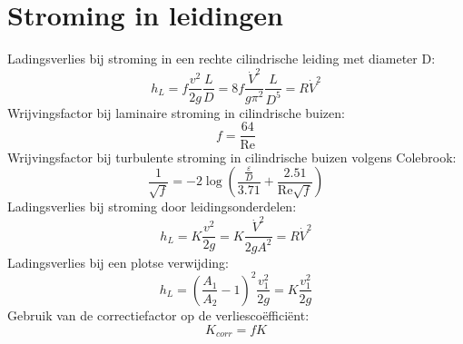 	\section{Stroming in leidingen}
\begin{multicols}{2}
	Ladingsverlies bij stroming in een rechte cilindrische leiding met diameter D:
	\begin{equation}
		h_L = f \frac{v^2}{2 g}\frac{L}{D} = 8 f \frac{\dot{V}^2}{g \pi^2}\frac{L}{D^5} = R \dot{V}^2
	\end{equation}
	Wrijvingsfactor bij laminaire stroming in cilindrische buizen:
	\begin{equation}
		f = \frac{64}{\text{Re}}
	\end{equation}
	Wrijvingsfactor bij turbulente stroming in cilindrische buizen volgens Colebrook:
	\begin{equation}
		\frac{1}{\sqrt{f}} = -2 \log \left( \frac{\frac{\varepsilon}{D}}{3.71}+\frac{2.51}{\text{Re}\sqrt{f}} \right)
	\end{equation}
	Ladingsverlies bij stroming door leidingsonderdelen:
	\begin{equation}
		h_L = K \frac{v^2}{2 g} = K \frac{\dot{V}^2}{2 g A^2} = R \dot{V}^2
	\end{equation}
	Ladingsverlies bij een plotse verwijding:
	\begin{equation}
		h_L = \left(\frac{A_1}{A_2}-1\right)^2 \frac{v_1^2}{2 g} = K \frac{v_1^2}{2 g}
	\end{equation}
	Gebruik van de correctiefactor op de verliescoëfficiënt:
	\begin{equation}
		K_{corr} = f K
	\end{equation}
\end{multicols}
